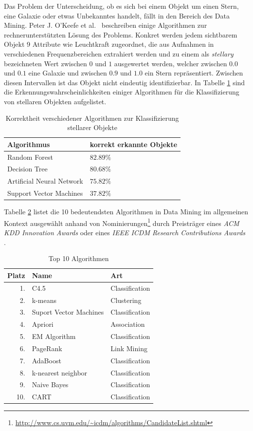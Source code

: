 \documentclass[12pt,journal,compsoc]{IEEEtran}
\begin{document}
Das Problem der Unterscheidung, ob es sich bei einem Objekt um einen Stern, eine Galaxie oder etwas Unbekanntes handelt, fällt in den Bereich des Data Mining. Peter J. O'Keefe et al.~\cite{o2009star}
beschreiben einige Algorithmen zur rechnerunterstützten Lösung des Problems. Konkret werden jedem sichtbarem Objekt 9 Attribute wie Leuchtkraft zugeordnet, die aus Aufnahmen in verschiedenen Frequenzbereichen extrahiert werden und zu einem als \emph{stellary} bezeichneten Wert zwischen $0$ und $1$ ausgewertet werden, welcher zwischen $0.0$ und $0.1$ eine Galaxie und zwischen $0.9$ und $1.0$ ein 
Stern repräsentiert. Zwischen diesen Intervallen ist das Objekt nicht eindeutig identifizierbar. In Tabelle \ref{Erkennungswahrscheinlichkeiten} sind die Erkennungswahrscheinlichkeiten einiger 
Algorithmen für die Klassifizierung von stellaren Objekten aufgelistet.

\begin{table}[!t]
\centering
\label{Erkennungswahrscheinlichkeiten}
\caption{Korrektheit verschiedener Algorithmen zur Klassifizierung stellarer Objekte \cite{o2009star}}
\begin{tabular}{l|l}
Algorithmus               & korrekt erkannte Objekte\\ \hline
Random Forest             & $82.89\%$ \\
Decision Tree             & $80.68\%$ \\
Artificial Neural Network & $75.82\%$ \\
Support Vector Machines   & $37.82\%$
\end{tabular}
\end{table}

Tabelle \ref{top10} listet die 10 bedeutendsten Algorithmen in Data Mining im allgemeinen Kontext ausgewählt anhand von Nominierungen\footnote{\url{http://www.cs.uvm.edu/~icdm/algorithms/CandidateList.shtml}} durch Preisträger eines \emph{ACM KDD Innovation Awards} oder eines \emph{IEEE ICDM Research Contributions Awards} \cite{wu2008top}.

\begin{table}[!t]
\centering
\caption{Top 10 Algorithmen \cite{wu2008top}}
\begin{tabular}{r|l|l}
Platz & Name & Art\\ \hline
1.& C4.5 & Classification\\
2.& k-means & Clustering\\
3.& Suport Vector Machines & Classification\\
4.& Apriori & Association\\
5.& EM Algorithm & Classification\\
6.& PageRank & Link Mining\\
7.& AdaBoost & Classification\\
8.& k-nearest neighbor & Classification\\
9.& Naive Bayes & Classification\\
10.& CART & Classification
\end{tabular}
\label{top10}
\end{table}
\end{document}
